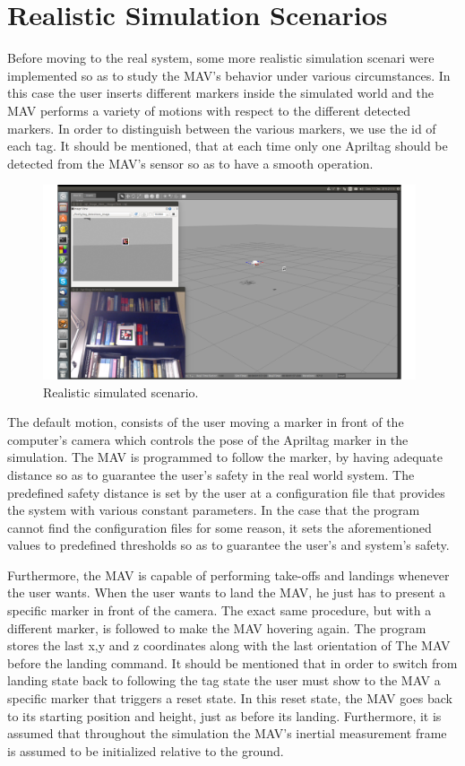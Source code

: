 \section{Realistic Simulation Scenarios}
\label{sec: apriltagFireflySimulation}

Before moving to the real system, some more realistic simulation scenari were implemented so as to study the MAV's behavior under various circumstances. In this case the user inserts different markers inside the simulated world and the MAV performs a variety of motions with respect to the different detected markers. In order to distinguish between the various markers, we use the id of each tag. It should be mentioned, that at each time only one Apriltag should be detected from the MAV's sensor so as to have a smooth operation.

\begin{figure}
   \centering
   \includegraphics[width=0.98\textwidth]{images/sim_atag_mavdet_win.pdf}
   \caption{Realistic simulated scenario.}
   \label{pics:apriltags_firefly_simulation_screen}
\end{figure}

The default motion, consists of the user moving a marker in front of the computer's camera which controls the pose of the Apriltag marker in the simulation. The MAV is programmed to follow the marker, by having adequate distance so as to guarantee the user's safety in the real world system. The predefined safety distance is set by the user at a configuration file that provides the system with various constant parameters. In the case that the program cannot find the configuration files for some reason, it sets the aforementioned values to predefined thresholds so as to guarantee the user's and system's safety. 

Furthermore, the MAV is capable of performing take-offs and landings whenever the user wants. When the user wants to land the MAV, he just has to present a specific marker in front of the camera. The exact same procedure, but with a different marker, is followed to make the MAV hovering again. The program stores the last x,y and z coordinates along with the last orientation of The MAV before the landing command. It should be mentioned that in order to switch from landing state back to following the tag state the user must show to the MAV a specific marker that triggers a reset state. In this reset state, the MAV goes back to its starting position and height, just as before its landing. Furthermore, it is assumed that throughout the simulation the MAV's inertial measurement frame is assumed to be initialized relative to the ground.

